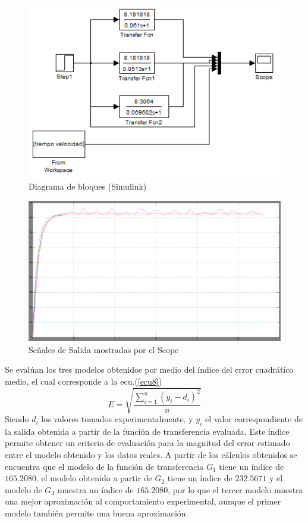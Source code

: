 \documentclass[twocolumn]{IEEEtran}
\begin{document}
\begin{figure}[H]
	\centering
		\includegraphics[scale=0.5]{figure7.png}
	\caption{Diagrama de bloques (Simulink)}
	\label{fig7}
\end{figure}
\begin{figure}[H]
	\centering
		\includegraphics[scale=0.15]{figure8.png}
	\caption{Señales de Salida mostradas por el Scope}
	\label{fig8}
\end{figure}
\noindent
Se evalúan los tres modelos obtenidos por medio del índice del error cuadrático medio, el cual corresponde a la ecu.(\ref{ecu8})
\begin{equation}
E = \sqrt {\frac{{\sum\limits_{i = 1}^n {\left( {y_i  - d_i } \right)} ^2 }}{n}}
\label{ecu8}
\end{equation}
\noindent
Siendo $d_i$ los valores tomados experimentalmente, y $y_i$ el valor correspondiente de la salida obtenida a partir de la función de transferencia evaluada. Este índice permite obtener un criterio de evaluación para la magnitud del error estimado entre el modelo obtenido y los datos reales. A partir de los cálculos obtenidos se encuentra que el modelo de la función de transferencia $G_1$ tiene un índice de $165.2080$, el modelo obtenido a partir de $G_2$ tiene un índice de $232.5671$ y el modelo de $G_3$ muestra un índice de $165.2080$, por lo que el tercer modelo muestra una mejor aproximación al comportamiento experimental, aunque el primer modelo también permite una buena aproximación.
\end{document}
